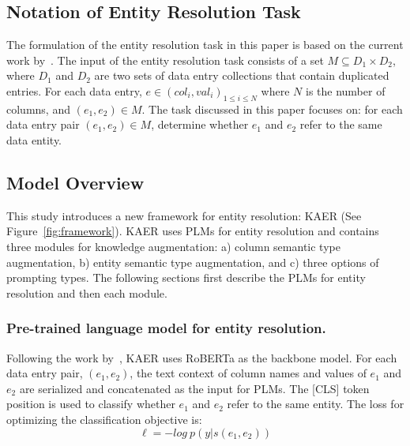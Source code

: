 


\subsection{Notation of Entity Resolution Task}
The formulation of the entity resolution task in this paper is based on the current work by~\citet{li_deep_2020}. The input of the entity resolution task consists of a set $M \subseteq D_1 \times D_2$, where $D_1$ and $D_2$ are two sets of data entry collections that contain duplicated entries.  
For each data entry, $e \in {(col_i, val_i)}_{1 \leq i \leq N}$ where $N$ is the number of columns, and $(e_1, e_2) \in M$. The task discussed in this paper focuses on: for each data entry pair $(e_1, e_2) \in M$, determine whether $e_1$ and $e_2$ refer to the same data entity.

\subsection{Model Overview}
This study introduces a new framework for entity resolution: KAER (See Figure~\ref{fig:framework}). 
KAER uses PLMs for entity resolution and contains three modules for knowledge augmentation: a) column semantic type augmentation, b) entity semantic type augmentation, and c) three options of prompting types. 
The following sections first describe the PLMs for entity resolution and then each module.


\subsubsection{Pre-trained language model for entity resolution.}
Following the work by~\citet{li_deep_2020}, KAER uses RoBERTa as the backbone model. For each data entry pair, $(e_1, e_2)$, 
 the text context of column names and values of $e_1$ and $e_2$ are serialized and concatenated as the input for PLMs. The [CLS] token position is used to classify whether $e_1$ and $e_2$ refer to the same entity. 
The loss for optimizing the classification objective is:
\begin{equation}
    \ell = - log\ p(y | s(e_1, e_2))
\end{equation}

